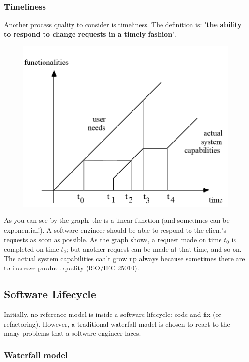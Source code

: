 \newpage

\subsubsection{Timeliness}

Another process quality to consider is timeliness. The definition is: "\textbf{the ability to respond to change requests in a timely fashion}".
\begin{figure}[!htp]
    \centering
    \includegraphics[width=.8\textwidth]{img/timeliness-1.png}
\end{figure}

\noindent
As you can see by the graph, the  is a linear function (and sometimes can be exponential!). A software engineer should be able to respond to the client's requests as soon as possible. As the graph shows, a request made on time $t_{0}$ is completed on time $t_{2}$; but another request can be made at that time, and so on. The actual system capabilities can't grow up always because sometimes there are  to increase product quality (ISO/IEC 25010).

\newpage

\subsection{Software Lifecycle}

Initially, no reference model is inside a software lifecycle: code and fix (or refactoring). However, a traditional waterfall model is chosen to react to the many problems that a software engineer faces.

\subsubsection{Waterfall model}

